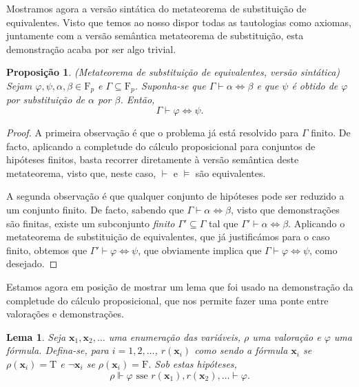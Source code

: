 \documentclass{report}
\newtheorem{prop}{Proposição}
\newtheorem{lema}{Lema}
\theoremstyle{definition}
\theoremstyle{remark}
\renewcommand{\bf}[1]{\mathbf{#1}}
\newcommand{\F}{\mathrm{F}}
\newcommand{\lt}{\mathrm{T}}
\newcommand{\lf}{\mathrm{F}}
\newcommand{\eqv}{\mathbin{\Leftrightarrow}}
\begin{document}
	Mostramos agora a versão sintática do metateorema de substituição de equivalentes. Visto que temos ao nosso dispor todas as tautologias como axiomas, juntamente com a versão semântica metateorema de substituição, esta demonstração acaba por ser algo trivial.
	
	\begin{prop}
	(Metateorema de substituição de equivalentes, versão sintática) Sejam $\varphi, \psi, \alpha, \beta \in \F_p$ e $\Gamma \subseteq \F_p$. Suponha-se que $\Gamma \vdash \alpha \eqv \beta$ e que $\psi$ é obtido de $\varphi$ por substituição de $\alpha$ por $\beta$. Então,
	\[\Gamma \vdash \varphi \eqv \psi.\]
	\end{prop}
	
	\begin{proof}
	A primeira observação é que o problema já está resolvido para $\Gamma$ finito. De facto, aplicando a completude do cálculo proposicional para conjuntos de hipóteses finitos, basta recorrer diretamente à versão semântica deste metateorema, visto que, neste caso, $\vdash$ e $\vDash$ são equivalentes.
	
	A segunda observação é que qualquer conjunto de hipóteses pode ser reduzido a um conjunto finito. De facto, sabendo que $\Gamma \vdash \alpha \eqv \beta$, visto que demonstrações são finitas, existe um subconjunto \emph{finito} $\Gamma' \subseteq \Gamma$ tal que $\Gamma' \vdash \alpha \eqv \beta$. Aplicando o metateorema de substituição de equivalentes, que já justificámos para o caso finito, obtemos que $\Gamma' \vdash \varphi \eqv \psi$, que obviamente implica que $\Gamma \vdash \varphi \eqv \psi$, como desejado.
	\end{proof}
	
	Estamos agora em posição de mostrar um lema que foi usado na demonstração da completude do cálculo proposicional, que nos permite fazer uma ponte entre valorações e demonstrações.
	
	\begin{lema}\label{lema:3}
	Seja $\bf x_1, \bf x_2, \dots$ uma enumeração das variáveis, $\rho$ uma valoração e $\varphi$ uma fórmula. Defina-se, para $i = 1, 2, \dots$, $r(\bf x_i)$ como sendo a fórmula $\bf x_i$ se $\rho(\bf x_i) = \lt$ e $\neg \bf x_i$ se $\rho(\bf x_i) = \lf$. Sob estas hipóteses,
	\[\rho \Vdash \varphi \text{ sse } r(\bf x_1), r(\bf x_2), \dots \vdash \varphi.\]
	\end{lema}
	
\end{document}
